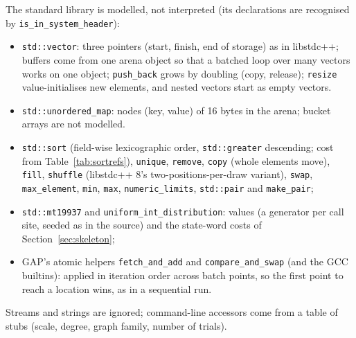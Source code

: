 \documentclass[11pt]{article}
\newcommand{\code}[1]{\texttt{#1}}
\newcommand{\secref}[1]{Section~\ref{#1}}
\newcommand{\tabref}[1]{Table~\ref{#1}}
\begin{document}
The standard library is modelled, not interpreted (its declarations are recognised by
\code{is\_in\_system\_header}):
\begin{itemize}
\item \code{std::vector}: three pointers (start, finish, end of storage) as in libstdc++; buffers come from one arena
object so that a batched loop over many vectors works on one object; \code{push\_back} grows by doubling (copy,
release); \code{resize} value-initialises new elements, and nested vectors start as empty vectors.
\item \code{std::unordered\_map}: nodes (key, value) of 16 bytes in the arena; bucket arrays are not modelled.
\item \code{std::sort} (field-wise lexicographic order, \code{std::greater} descending; cost from
\tabref{tab:sortrefs}), \code{unique}, \code{remove}, \code{copy} (whole elements move), \code{fill},
\code{shuffle} (libstdc++ 8's two-positions-per-draw variant), \code{swap}, \code{max\_element}, \code{min},
\code{max}, \code{numeric\_limits}, \code{std::pair} and \code{make\_pair};
\item \code{std::mt19937} and \code{uniform\_int\_distribution}: values (a generator per call site, seeded as in the
source) and the state-word costs of \secref{sec:skeleton};
\item GAP's atomic helpers \code{fetch\_and\_add} and \code{compare\_and\_swap} (and the GCC builtins): applied in
iteration order across batch points, so the first point to reach a location wins, as in a sequential run.
\end{itemize}
Streams and strings are ignored; command-line accessors come from a table of stubs (scale, degree, graph family,
number of trials).
\end{document}
